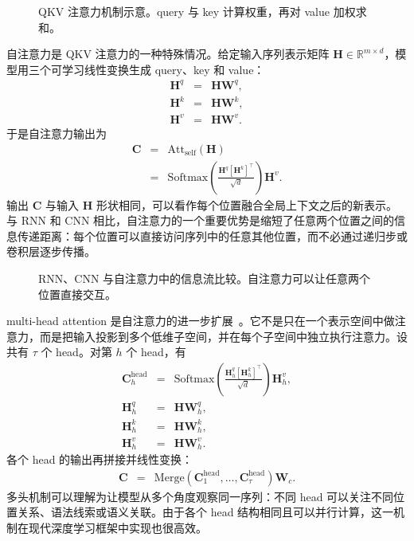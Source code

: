 \begin{figure}[htbp]
  \centering
  
  \caption{QKV 注意力机制示意。query 与 key 计算权重，再对 value 加权求和。}
  \label{fig:nlpbook-qkv-attention}
\end{figure}

自注意力是 QKV 注意力的一种特殊情况。给定输入序列表示矩阵 $\mathbf{H}\in\mathbb{R}^{m\times d}$，模型用三个可学习线性变换生成 query、key 和 value：
\begin{eqnarray}
\mathbf{H}^{q} &=& \mathbf{H}\mathbf{W}^{q},\\
\mathbf{H}^{k} &=& \mathbf{H}\mathbf{W}^{k},\\
\mathbf{H}^{v} &=& \mathbf{H}\mathbf{W}^{v}.
\end{eqnarray}
于是自注意力输出为
\begin{eqnarray}
\mathbf{C}
& = &
\mathrm{Att}_{\mathrm{self}}(\mathbf{H}) \nonumber \\
& = &
\mathrm{Softmax}
\left(
\frac{\mathbf{H}^{q}[\mathbf{H}^{k}]^{\top}}{\sqrt{d}}
\right)
\mathbf{H}^{v}.
\end{eqnarray}
输出 $\mathbf{C}$ 与输入 $\mathbf{H}$ 形状相同，可以看作每个位置融合全局上下文之后的新表示。与 RNN 和 CNN 相比，自注意力的一个重要优势是缩短了任意两个位置之间的信息传递距离：每个位置可以直接访问序列中的任意其他位置，而不必通过递归步或卷积层逐步传播。


\begin{figure}[htbp]
  \centering
  
  \caption{RNN、CNN 与自注意力中的信息流比较。自注意力可以让任意两个位置直接交互。}
  \label{fig:nlpbook-information-flow}
\end{figure}

multi-head attention 是自注意力的进一步扩展~\cite{VaswaniEtAl2017Transformer}。它不是只在一个表示空间中做注意力，而是把输入投影到多个低维子空间，并在每个子空间中独立执行注意力。设共有 $\tau$ 个 head。对第 $h$ 个 head，有
\begin{eqnarray}
\mathbf{C}_{h}^{\mathrm{head}}
& = &
\mathrm{Softmax}
\left(
\frac{\mathbf{H}_{h}^{q}[\mathbf{H}_{h}^{k}]^{\top}}{\sqrt{d}}
\right)
\mathbf{H}_{h}^{v},\\
\mathbf{H}_{h}^{q} &=& \mathbf{H}\mathbf{W}_{h}^{q},\\
\mathbf{H}_{h}^{k} &=& \mathbf{H}\mathbf{W}_{h}^{k},\\
\mathbf{H}_{h}^{v} &=& \mathbf{H}\mathbf{W}_{h}^{v}.
\end{eqnarray}
各个 head 的输出再拼接并线性变换：
\begin{eqnarray}
\mathbf{C}
& = &
\mathrm{Merge}
(\mathbf{C}_{1}^{\mathrm{head}},\ldots,\mathbf{C}_{\tau}^{\mathrm{head}})
\mathbf{W}_{c}.
\end{eqnarray}
多头机制可以理解为让模型从多个角度观察同一序列：不同 head 可以关注不同位置关系、语法线索或语义关联。由于各个 head 结构相同且可以并行计算，这一机制在现代深度学习框架中实现也很高效。


